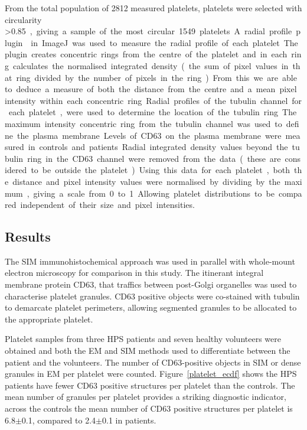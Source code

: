 From the total population of 2812 measured platelets, platelets were selected with circularity \textgreater\SI{0.85}, giving a sample of the most circular 1549 platelets.  A radial profile plugin~\cite{Baggethun2001} in ImageJ was used to measure the radial profile of each platelet. The plugin creates concentric rings from the centre of the platelet and in each ring calculates the normalised integrated density (the sum of pixel values in that ring divided by the number of pixels in the ring). From this we are able to deduce a measure of both the distance from the centre and a mean pixel intensity within each concentric ring.

Radial profiles of the tubulin channel for each platelet, were used to determine the location of the tubulin ring. The maximum intensity concentric ring from the tubulin channel was used to define the plasma membrane. Levels of CD63 on the plasma membrane were measured in controls and patients. Radial integrated density values beyond the tubulin ring in the CD63 channel were removed from the data (these are considered to be outside the platelet). Using this data for each platelet, both the distance and pixel intensity values were normalised by dividing by the maximum, giving a scale from 0 to 1. Allowing platelet distributions to be compared independent of their size and pixel intensities.

\subsection{Results}
The SIM immunohistochemical approach was used in parallel with whole-mount electron microscopy for comparison in this study. The itinerant integral membrane protein CD63, that traffics between post-Golgi organelles was used to characterise platelet granules. CD63 positive objects were co-stained with tubulin to demarcate platelet perimeters, allowing segmented granules to be allocated to the appropriate platelet.

Platelet samples from three HPS patients and seven healthy volunteers were obtained and both the EM and SIM methods used to differentiate between the patient and the volunteers. The number of CD63-positive objects in SIM or dense granules in EM per platelet were counted. Figure~\ref{platelet_ecdf} shows the HPS patients have fewer CD63 positive structures per platelet than the controls. The mean number of granules per platelet provides a striking diagnostic indicator, across the controls the mean number of CD63 positive structures per platelet is 6.8$\pm$0.1, compared to 2.4$\pm$0.1 in patients.

